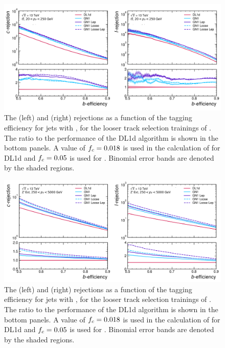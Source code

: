 \begin{figure}[!p]
    \centering
    \includegraphics[width=\textwidth]{chapters/gnn_tagger/figs/gn1_loose_ttbar.pdf}
    \caption{
        The \cjet (left) and \ljet (right) rejections as a function of the \bjet tagging efficiency for \ttbar jets with \ttbarpt, for the looser track selection trainings of \GNN.
        The ratio to the performance of the DL1d algorithm \cite{ATLAS:2022qxm} is shown in the bottom panels.
        A value of $f_c = 0.018$ is used in the calculation of \Db for DL1d and $f_c = 0.05$ is used for \GNN.
        Binomial error bands are denoted by the shaded regions.
    }
    \label{fig:ttbar_gn1_loose}
\end{figure}

\begin{figure}[!p]
    \centering
    \includegraphics[width=\textwidth]{chapters/gnn_tagger/figs/gn1_loose_zprime.pdf}
    \caption{
        The \cjet (left) and \ljet (right) rejections as a function of the \bjet tagging efficiency for \Zprime jets with \Zprimept, for the looser track selection trainings of \GNN.
        The ratio to the performance of the DL1d algorithm \cite{ATLAS:2022qxm} is shown in the bottom panels.
        A value of $f_c = 0.018$ is used in the calculation of \Db for DL1d and $f_c = 0.05$ is used for \GNN.
        Binomial error bands are denoted by the shaded regions.
    }
    \label{fig:zprime_gn1_loose}
\end{figure}

